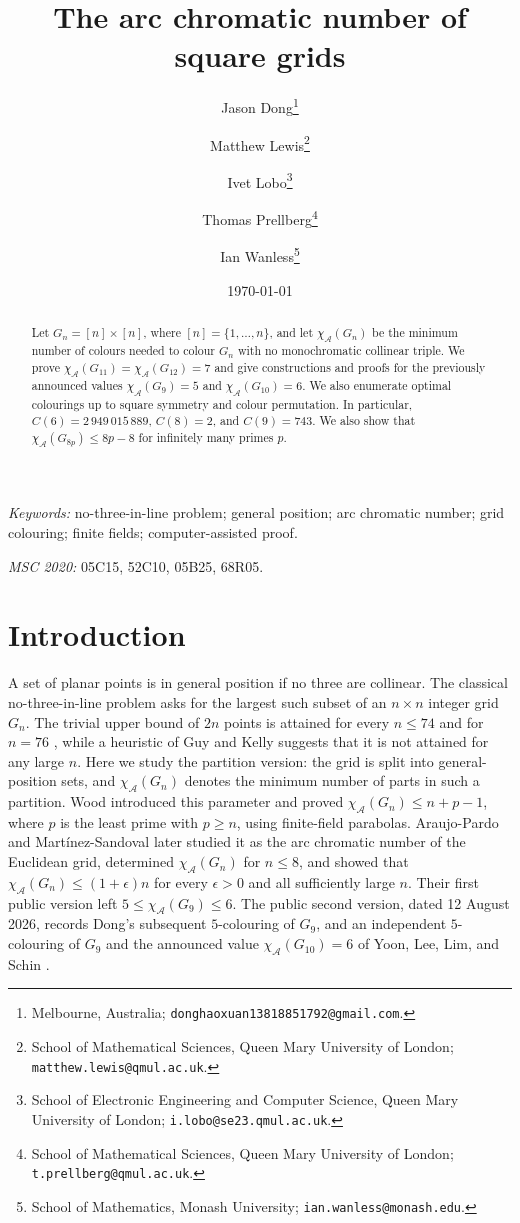 \documentclass[11pt]{article}
\title{The arc chromatic number of square grids}
\author{%
  Jason Dong\thanks{Melbourne, Australia;
    \texttt{donghaoxuan13818851792@gmail.com}.}
  \and Matthew Lewis\thanks{School of Mathematical Sciences, Queen Mary
    University of London; \texttt{matthew.lewis@qmul.ac.uk}.}
  \and Ivet Lobo\thanks{School of Electronic Engineering and Computer Science, Queen Mary
    University of London; \texttt{i.lobo@se23.qmul.ac.uk}.}
  \and Thomas Prellberg\thanks{School of Mathematical Sciences, Queen Mary
    University of London; \texttt{t.prellberg@qmul.ac.uk}.}
  \and Ian Wanless\thanks{School of Mathematics, Monash University;
    \texttt{ian.wanless@monash.edu}.}}
\date{\today}
\theoremstyle{definition}
\theoremstyle{remark}
\renewcommand{\ge}{\geqslant}
\renewcommand{\le}{\leqslant}
\begin{document}
\maketitle

\begin{abstract}
Let \(G_n=[n]\times[n]\), where \([n]=\{1,\ldots,n\}\), and let
\(\chi_{\mathcal{A}}(G_n)\) be the minimum number of
colours needed to colour \(G_n\) with no monochromatic collinear triple.  We
prove \(\chi_{\mathcal{A}}(G_{11})=\chi_{\mathcal{A}}(G_{12})=7\) and give
constructions and proofs for the previously announced values
\(\chi_{\mathcal{A}}(G_9)=5\) and \(\chi_{\mathcal{A}}(G_{10})=6\).
We also enumerate optimal
colourings up to square symmetry and colour permutation.  In particular,
\(C(6)=2\,949\,015\,889\), \(C(8)=2\), and \(C(9)=743\).
We also show that \(\chi_{\mathcal A}(G_{8p})\le 8p-8\) for infinitely
many primes \(p\).

\end{abstract}

\noindent\emph{Keywords:} no-three-in-line problem; general position; arc
chromatic number; grid colouring; finite fields; computer-assisted proof.

\noindent\emph{MSC 2020:} 05C15, 52C10, 05B25, 68R05.

\section{Introduction}

A set of planar points is in general position if no three are collinear.  The
classical no-three-in-line problem
\cite{Dudeney1917,Flammenkamp1992,Flammenkamp1998,GuyKelly1968,HallEtAl1975,Prellberg2027}
asks for the largest such subset of an \(n\times n\) integer grid \(G_n\).
The trivial upper bound of \(2n\) points is attained for every \(n\le74\) and
for \(n=76\) \cite{FlammenkampHistory,Prellberg2027}, while a heuristic of
Guy and Kelly \cite{GuyKelly1968} suggests that it is not attained for any large
\(n\).  Here we study the partition version: the grid is split into
general-position sets, and \(\chi_{\mathcal{A}}(G_n)\) denotes the minimum
number of parts in such a partition.  Wood \cite{Wood2004} introduced this
parameter and proved \(\chi_{\mathcal{A}}(G_n)\le n+p-1\), where \(p\) is the
least prime with \(p\ge n\), using finite-field parabolas.  Araujo-Pardo and
Mart\'inez-Sandoval \cite{AraujoMartinez2026,AraujoMartinezCode2026} later
studied it as the arc chromatic number of the Euclidean grid, determined
\(\chi_{\mathcal{A}}(G_n)\) for \(n\le8\), and showed that
\(\chi_{\mathcal{A}}(G_n)\le(1+\epsilon)n\) for every \(\epsilon>0\) and all
sufficiently large \(n\).  Their first public version left
\(5\le\chi_{\mathcal A}(G_9)\le6\).  The public second version, dated
12 August 2026, records Dong's subsequent \(5\)-colouring of \(G_9\), and an
independent \(5\)-colouring of \(G_9\) and the announced value
\(\chi_{\mathcal A}(G_{10})=6\) of Yoon, Lee, Lim, and Schin
\cite[Section~6]{AraujoMartinez2026}.
\end{document}
